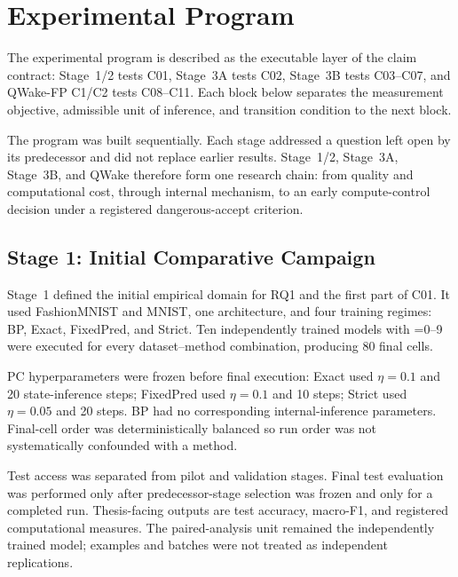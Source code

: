 \chapter{Experimental Program}
\label{ch:experiments-en}

The experimental program is described as the executable layer of the claim contract:
Stage~1/2 tests C01, Stage~3A tests C02, Stage~3B tests C03--C07, and QWake-FP C1/C2
tests C08--C11. Each block below separates the measurement objective, admissible unit
of inference, and transition condition to the next block.

The program was built sequentially. Each stage addressed a question left open by its
predecessor and did not replace earlier results. Stage~1/2, Stage~3A, Stage~3B, and
QWake therefore form one research chain: from quality and computational cost, through
internal mechanism, to an early compute-control decision under a registered
dangerous-accept criterion.



\section{Stage 1: Initial Comparative Campaign}
\label{sec:stage1-experiment-en}

Stage~1 defined the initial empirical domain for RQ1 and the first part of C01. It used
FashionMNIST and MNIST, one  architecture, and four training
regimes: BP, Exact, FixedPred, and Strict. Ten independently trained models with
=0--9 were executed for every dataset--method combination, producing
80 final cells.

PC hyperparameters were frozen before final execution: Exact used \(\eta=0.1\) and 20
state-inference steps; FixedPred used \(\eta=0.1\) and 10 steps; Strict used
\(\eta=0.05\) and 20 steps. BP had no corresponding internal-inference parameters.
Final-cell order was deterministically balanced so run order was not systematically
confounded with a method.

Test access was separated from pilot and validation stages. Final test evaluation was
performed only after predecessor-stage selection was frozen and only for a completed
run. Thesis-facing outputs are test accuracy, macro-F1, and registered computational
measures. The paired-analysis unit remained the independently trained model; examples
and batches were not treated as independent replications.

